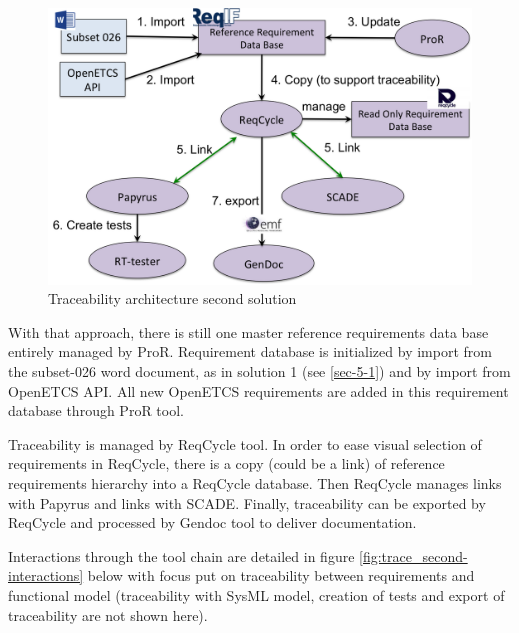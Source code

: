 \documentclass[11pt]{template/openetcs_report}
\begin{document}
\begin{figure}[htb]
\centering
\includegraphics[width=.9\linewidth]{images/second_trace_solution-ProR-ReqCycle.png}
\caption{\label{fig:trace_second}Traceability architecture second solution}
\end{figure}

With that approach, there is still one master reference requirements data base entirely managed by ProR. Requirement database is initialized by import from the subset-026 word document, as in solution 1 (see \ref{sec-5-1}) and by import from OpenETCS API.
All new OpenETCS requirements are added in this requirement database through ProR tool.

Traceability is managed by ReqCycle tool. In order to ease visual selection of requirements in ReqCycle, there is a copy (could be a link) of reference requirements hierarchy into a ReqCycle database. Then ReqCycle manages links with Papyrus and links with SCADE. 
Finally, traceability can be exported by ReqCycle and processed by Gendoc tool to deliver documentation.

Interactions through the tool chain are detailed in figure \ref{fig:trace_second-interactions} below with focus put on traceability between requirements and functional model (traceability with SysML model, creation of tests and export of traceability are not shown here). 
\end{document}
